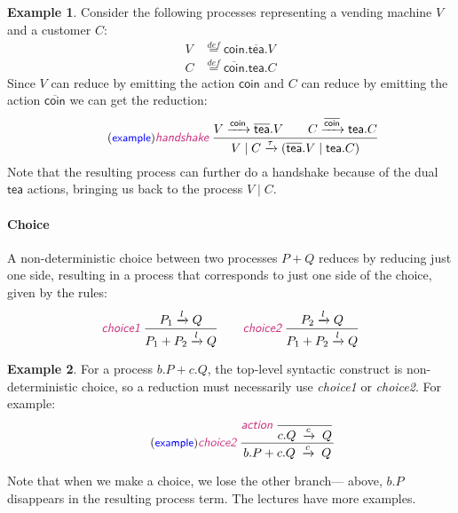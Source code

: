 \documentclass{article}
\newcommand{\exampleLabel}{\tag{\small{\textcolor{blue}{\textsf{example}}}}}
\theoremstyle{definition}
\newtheorem{example}{Example}
\newcommand{\trule}[1]{\textcolor{labelColor}{\textit{\textsf{#1}}}\;}
\begin{document}
\begin{example}
  Consider the following processes representing a vending machine
  $V$ and a customer $C$:
  \begin{align*}
V  & {\mathrel{\mathop{=}\limits^{{def}}}}
     {\mathsf{coin}}.\overline{\mathsf{tea}}.V \\
C & {\mathrel{\mathop{=}\limits^{{def}}}}
\overline{\mathsf{coin}}.{\mathsf{tea}}.C
  \end{align*}
  Since $V$ can reduce by emitting the action $\mathsf{coin}$ and
  $C$ can reduce by emitting the action $\overline{\mathsf{coin}}$
   we can get the reduction:
  \begin{align*}
    \exampleLabel{}
    \trule{handshake}
    \dfrac{V \xrightarrow{\mathsf{coin}} \overline{\mathsf{tea}}.V
    \qquad
    C \xrightarrow{\overline{\mathsf{coin}}} \mathsf{tea}.C}
    {V \mid C \xrightarrow{\tau} (\overline{\mathsf{tea}}.V \mid \mathsf{tea}.C)}
  \end{align*}
  Note that the resulting process can further do a handshake because
  of the dual $\mathsf{tea}$ actions, bringing us back to the process
  $V \mid C$.
\end{example}

\paragraph{Choice}
A non-deterministic choice between two processes $P + Q$ reduces
by reducing just one side, resulting in a process that corresponds
to just one side of the choice, given by the rules:
%
\begin{align*}
\trule{choice1}\dfrac{P_1 \xrightarrow{l} Q}{P_1 + P_2 \xrightarrow{l} Q}
\qquad
\trule{choice2}\dfrac{P_2 \xrightarrow{l} Q}{P_1 + P_2 \xrightarrow{l} Q}
\end{align*}
%
\begin{example} For a process $b.P + c.Q$, the top-level syntactic
  construct is non-deterministic choice, so a reduction must necessarily
   use \trule{choice1} or \trule{choice2}. For example:
  \begin{align*}
    \exampleLabel{}
\trule{choice2}
  \dfrac{\trule{action}\dfrac{}{c . Q \; \xrightarrow{c} \; Q}}
        {b . P + c.Q \; \xrightarrow{c} \; Q}
\end{align*}
\end{example}
%
\noindent
Note that when we make a choice, we lose the other branch--- above,
$b.P$ disappears in the resulting process term. The lectures have more examples.
\end{document}
